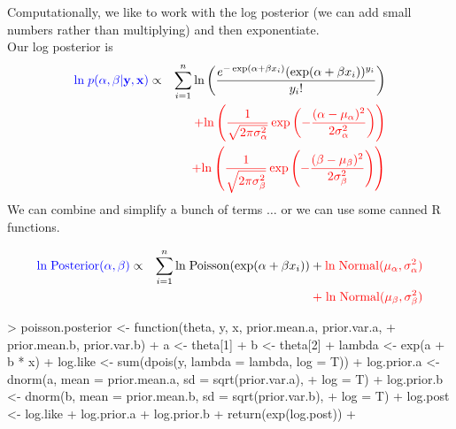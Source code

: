 \documentclass{beamer}
\begin{document}
\begin{frame}[fragile]
Computationally, we like to work with the log posterior (we can add
small numbers rather than multiplying) and then exponentiate.\\
\bigskip
\pause 
Our log posterior is
\footnotesize
\begin{eqnarray*}
\textcolor{blue}{\mathrm{ln} \; p(\alpha, \beta | \mathbf{y}, \mathbf{x})} &\propto&
\sum_{i=1}^n \mathrm{ln} \left( \frac{e^{-\exp (\alpha + \beta x_i)}
(\exp (\alpha + \beta x_i))^{y_i}}{y_i !} \right) \\
&\phantom{\propto}& \textcolor{red}{ + \mathrm{ln}
\left( \frac{1}{\sqrt{2\pi \sigma^2_{\alpha}}} \exp  \left(-\frac{(\alpha -
\mu_{\alpha})^2}{2 \sigma_{\alpha}^2}\right) \right) }\\ 
&\phantom{\propto}&  \textcolor{red}{+ \mathrm{ln} \left( \frac{1}{\sqrt{2\pi
\sigma^2_{\beta}}} \exp \left(-\frac{(\beta - \mu_{\beta})^2}{2
\sigma_{\beta}^2}\right) \right)} 
\end{eqnarray*}
\normalsize
\pause
We can combine and simplify a bunch of terms $\dots$ \pause or we can
use some canned R functions.
\end{frame}

\begin{frame}[fragile]
\footnotesize
\begin{eqnarray*}
\textcolor{blue}{\mathrm{ln \; Posterior}(\alpha, \beta)} &\propto& \sum_{i=1}^n
\mathrm{ln \; Poisson}(\exp (\alpha + \beta x_i)) + \textcolor{red}{\mathrm{ln \;
Normal}(\mu_{\alpha}, \sigma^2_{\alpha}) } \\
&\phantom{\propto}& \textcolor{red}{+ \; \mathrm{ln \; Normal}(\mu_{\beta}, \sigma^2_{\beta})} \\
\end{eqnarray*}
\pause
\tiny
\begin{Schunk}
\begin{Sinput}
> poisson.posterior <- function(theta, y, x, prior.mean.a, prior.var.a, 
+     prior.mean.b, prior.var.b) {
+     a <- theta[1]
+     b <- theta[2]
+     lambda <- exp(a + b * x)
+     log.like <- sum(dpois(y, lambda = lambda, log = T))
+     log.prior.a <- dnorm(a, mean = prior.mean.a, sd = sqrt(prior.var.a), 
+         log = T)
+     log.prior.b <- dnorm(b, mean = prior.mean.b, sd = sqrt(prior.var.b), 
+         log = T)
+     log.post <- log.like + log.prior.a + log.prior.b
+     return(exp(log.post))
+ }
\end{Sinput}
\end{Schunk}
\normalsize 
\end{frame}
\end{document}
